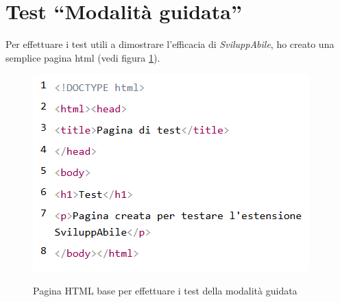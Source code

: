 \section{Test ``Modalità guidata''}
\noindent Per effettuare i test utili a dimostrare l'efficacia di \textit{SviluppAbile}, ho creato una semplice pagina \acrshort{html} (vedi figura \ref{fig:pagina_test}).
\begin{figure}[H]
    \centering
    \includegraphics[width=0.5\linewidth, alt={Pagina \acrshort{html} base per effettuare i test della modalità guidata}]{img/test_MG.png}
    \caption{Pagina HTML base per effettuare i test della modalità guidata}\label{fig:pagina_test}
\end{figure}

